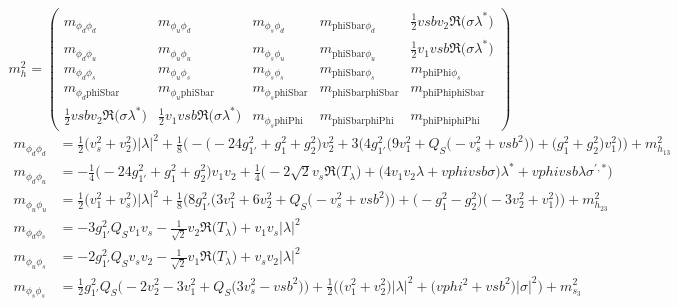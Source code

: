 \begin{itemize}
\begin{equation} 
m^2_{h} = \left( 
\begin{array}{ccccc}
m_{\phi_{d}\phi_{d}} &m_{\phi_{u}\phi_{d}} &m_{\phi_s\phi_{d}} &m_{\text{phiSbar}\phi_{d}} &\frac{1}{2} vsb v_2 {\Re\Big(\sigma \lambda^* \Big)} \\ 
m_{\phi_{d}\phi_{u}} &m_{\phi_{u}\phi_{u}} &m_{\phi_s\phi_{u}} &m_{\text{phiSbar}\phi_{u}} &\frac{1}{2} v_1 vsb {\Re\Big(\sigma \lambda^* \Big)} \\ 
m_{\phi_{d}\phi_s} &m_{\phi_{u}\phi_s} &m_{\phi_s\phi_s} &m_{\text{phiSbar}\phi_s} &m_{\text{phiPhi}\phi_s}\\ 
m_{\phi_{d}\text{phiSbar}} &m_{\phi_{u}\text{phiSbar}} &m_{\phi_s\text{phiSbar}} &m_{\text{phiSbar}\text{phiSbar}} &m_{\text{phiPhi}\text{phiSbar}}\\ 
\frac{1}{2} vsb v_2 {\Re\Big(\sigma \lambda^* \Big)}  &\frac{1}{2} v_1 vsb {\Re\Big(\sigma \lambda^* \Big)}  &m_{\phi_s\text{phiPhi}} &m_{\text{phiSbar}\text{phiPhi}} &m_{\text{phiPhi}\text{phiPhi}}\end{array} 
\right) 
 \end{equation} 
\begin{align} 
m_{\phi_{d}\phi_{d}} &= \frac{1}{2} \Big(v_{s}^{2} + v_{2}^{2}\Big)|\lambda|^2  + \frac{1}{8} \Big(- \Big(-24 g_{1'}^{2}  + g_{1}^{2} + g_{2}^{2}\Big)v_{2}^{2}  + 3 \Big(4 g_{1'}^{2} \Big(9 v_{1}^{2}  + Q_{S} \Big(- v_{s}^{2}  + vsb^{2}\Big)\Big) + \Big(g_{1}^{2} + g_{2}^{2}\Big)v_{1}^{2} \Big)\Big) + m_{h_{13}}^2\\ 
m_{\phi_{d}\phi_{u}} &= -\frac{1}{4} \Big(-24 g_{1'}^{2}  + g_{1}^{2} + g_{2}^{2}\Big)v_1 v_2  + \frac{1}{4} \Big(-2 \sqrt{2} v_s {\Re\Big(T_{\lambda}\Big)}  + \Big(4 v_1 v_2 \lambda  + vphi vsb \sigma \Big)\lambda^*  + vphi vsb \lambda \sigma^{\prime,*} \Big)\\ 
m_{\phi_{u}\phi_{u}} &= \frac{1}{2} \Big(v_{1}^{2} + v_{s}^{2}\Big)|\lambda|^2  + \frac{1}{8} \Big(8 g_{1'}^{2} \Big(3 v_{1}^{2}  + 6 v_{2}^{2}  + Q_{S} \Big(- v_{s}^{2}  + vsb^{2}\Big)\Big) + \Big(- g_{1}^{2}  - g_{2}^{2} \Big)\Big(-3 v_{2}^{2}  + v_{1}^{2}\Big)\Big) + m_{h_{23}}^2\\ 
m_{\phi_{d}\phi_s} &= -3 g_{1'}^{2} Q_{S} v_1 v_s  - \frac{1}{\sqrt{2}} v_2 {\Re\Big(T_{\lambda}\Big)}  + v_1 v_s |\lambda|^2 \\ 
m_{\phi_{u}\phi_s} &= -2 g_{1'}^{2} Q_{S} v_s v_2  - \frac{1}{\sqrt{2}} v_1 {\Re\Big(T_{\lambda}\Big)}  + v_s v_2 |\lambda|^2 \\ 
m_{\phi_s\phi_s} &= \frac{1}{2} g_{1'}^{2} Q_{S} \Big(-2 v_{2}^{2}  -3 v_{1}^{2}  + Q_{S} \Big(3 v_{s}^{2}  - vsb^{2} \Big)\Big) + \frac{1}{2} \Big(\Big(v_{1}^{2} + v_{2}^{2}\Big)|\lambda|^2  + \Big(vphi^{2} + vsb^{2}\Big)|\sigma|^2 \Big) + m_{s_3}^2\\ 

\end{align}
\end{itemize}
